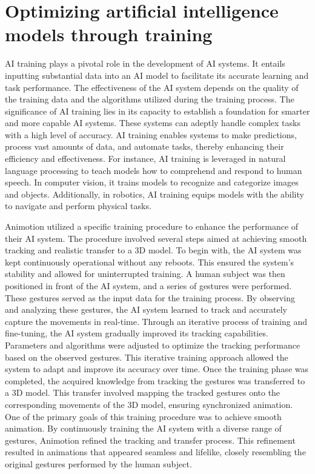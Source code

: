 \section{Optimizing artificial intelligence models through training}
AI training plays a pivotal role in the development of AI systems. It entails inputting substantial data into an AI model to facilitate 
its accurate learning and task performance. The effectiveness of the AI system depends on the quality of the training data 
and the algorithms utilized during the training process.
The significance of AI training lies in its capacity to establish a foundation for smarter and more capable AI systems. 
These systems can adeptly handle complex tasks with a high level of accuracy. AI training enables systems to make predictions, 
process vast amounts of data, and automate tasks, thereby enhancing their efficiency and effectiveness.
For instance, AI training is leveraged in natural language processing to teach models how to comprehend and respond 
to human speech. In computer vision, it trains models to recognize and categorize images and objects. Additionally, 
in robotics, AI training equips models with the ability to navigate and perform physical tasks.\cite{training}

Animotion utilized a specific training procedure to enhance the performance of their AI system. 
The procedure involved several steps aimed at achieving smooth tracking and realistic transfer to a 3D model.
To begin with, the AI system was kept continuously operational without any reboots. 
This ensured the system's stability and allowed for uninterrupted training.
A human subject was then positioned in front of the AI system, and a series of gestures were performed. 
These gestures served as the input data for the training process. By observing and analyzing these gestures, 
the AI system learned to track and accurately capture the movements in real-time.
Through an iterative process of training and fine-tuning, the AI system gradually improved its tracking capabilities.
Parameters and algorithms were adjusted to optimize the tracking performance based on the observed gestures. 
This iterative training approach allowed the system to adapt and improve its accuracy over time.
Once the training phase was completed, the acquired knowledge from tracking the gestures was transferred to a 3D model. 
This transfer involved mapping the tracked gestures onto the corresponding movements of the 3D model, ensuring synchronized animation.
One of the primary goals of this training procedure was to achieve smooth animation. By continuously training the 
AI system with a diverse range of gestures, Animotion refined the tracking and transfer process. 
This refinement resulted in animations that appeared seamless and lifelike, closely resembling the original gestures performed by the human subject.

